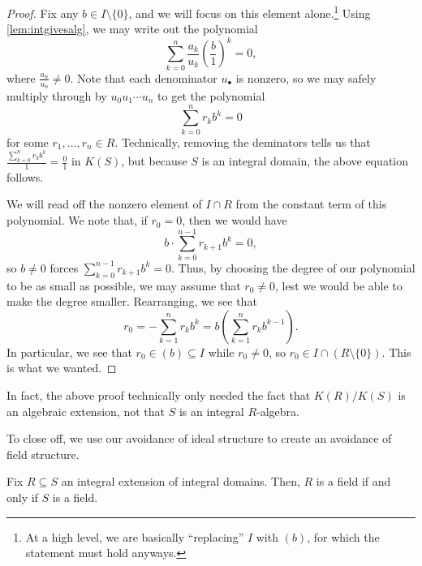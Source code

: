 \begin{proof}
	Fix any $b\in I\setminus\{0\}$, and we will focus on this element alone.\footnote{At a high level, we are basically ``replacing'' $I$ with $(b)$, for which the statement must hold anyways.} Using \autoref{lem:intgivesalg}, we may write out the polynomial
	\[\sum_{k=0}^n\frac{a_k}{u_k}\left(\frac b1\right)^k=0,\]
	where $\frac{a_n}{u_n}\ne0$. Note that each denominator $u_\bullet$ is nonzero, so we may safely multiply through by $u_0u_1\cdots u_n$ to get the polynomial
	\[\sum_{k=0}^nr_kb^k=0\]
	for some $r_1,\ldots,r_n\in R$. Technically, removing the deminators tells us that $\frac{\sum_{k=0}^nr_kb^k}1=\frac01$ in $K(S)$, but because $S$ is an integral domain, the above equation follows.

	We will read off the nonzero element of $I\cap R$ from the constant term of this polynomial. We note that, if $r_0=0$, then we would have
	\[b\cdot\sum_{k=0}^{n-1}r_{k+1}b^k=0,\]
	so $b\ne0$ forces $\sum_{k=0}^{n-1}r_{k+1}b^k=0$. Thus, by choosing the degree of our polynomial to be as small as possible, we may assume that $r_0\ne0$, lest we would be able to make the degree smaller. Rearranging, we see that
	\[r_0=-\sum_{k=1}^nr_kb^k=b\left(\sum_{k=1}^nr_kb^{k-1}\right).\]
	In particular, we see that $r_0\in(b)\subseteq I$ while $r_0\ne0$, so $r_0\in I\cap(R\setminus\{0\})$. This is what we wanted.
\end{proof}
\begin{remark}[Nir]
	In fact, the above proof technically only needed the fact that $K(R)/K(S)$ is an algebraic extension, not that $S$ is an integral $R$-algebra.
\end{remark}
To close off, we use our avoidance of ideal structure to create an avoidance of field structure.
\begin{proposition} \label{prop:integralfields}
	Fix $R\subseteq S$ an integral extension of integral domains. Then, $R$ is a field if and only if $S$ is a field.
\end{proposition}
